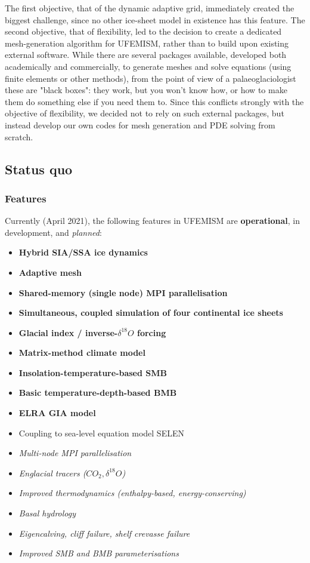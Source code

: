 \documentclass{article}
\begin{document}
The first objective, that of the dynamic adaptive grid, immediately created the biggest challenge, since no other ice-sheet model in existence has this feature. The second objective, that of flexibility, led to the decision to create a dedicated mesh-generation algorithm for UFEMISM, rather than to build upon existing external software. While there are several packages available, developed both academically and commercially, to generate meshes and solve equations (using finite elements or other methods), from the point of view of a palaeoglaciologist these are "black boxes": they work, but you won't know how, or how to make them do something else if you need them to. Since this conflicts strongly with the objective of flexibility, we decided not to rely on such external packages, but instead develop our own codes for mesh generation and PDE solving from scratch.

\subsection{Status quo}

\subsubsection{Features}

Currently (April 2021), the following features in UFEMISM are \textbf{operational}, in development, and \textit{planned}:

\begin{itemize}

\item \textbf{Hybrid SIA/SSA ice dynamics}
\item \textbf{Adaptive mesh}
\item \textbf{Shared-memory (single node) MPI parallelisation}
\item \textbf{Simultaneous, coupled simulation of four continental ice sheets}
\item \textbf{Glacial index / inverse-$\delta^{18}O$ forcing}
\item \textbf{Matrix-method climate model}
\item \textbf{Insolation-temperature-based SMB}
\item \textbf{Basic temperature-depth-based BMB}
\item \textbf{ELRA GIA model}
\\
\item Coupling to sea-level equation model SELEN
\\
\item \textit{Multi-node MPI parallelisation}
\item \textit{Englacial tracers ($CO_2, \delta^{18}O$)}
\item \textit{Improved thermodynamics (enthalpy-based, energy-conserving)}
\item \textit{Basal hydrology}
\item \textit{Eigencalving, cliff failure, shelf crevasse failure}
\item \textit{Improved SMB and BMB parameterisations}

\end{itemize}
\end{document}
